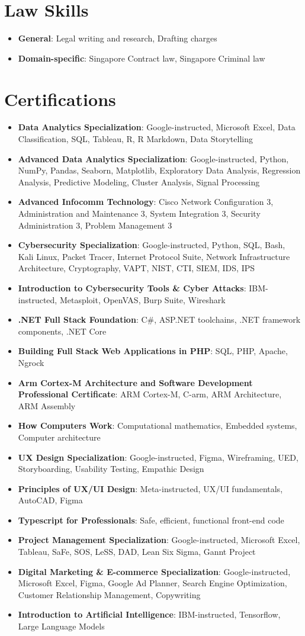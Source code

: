 \documentclass[letterpaper,11pt]{article}
\newcommand{\resumeItem}[2]{
  \item\small{
    \textbf{#1}{: #2 \vspace{-2pt}}
  }
}
\newcommand{\resumeSubItem}[2]{\resumeItem{#1}{#2}\vspace{-4pt}}
\newcommand{\resumeSubHeadingListStart}{\begin{itemize}[leftmargin=*]}
\newcommand{\resumeSubHeadingListEnd}{\end{itemize}}
\begin{document}
 \section{Law Skills}
 \resumeSubHeadingListStart
   \resumeSubItem{General}
      {Legal writing and research, Drafting charges}
   \resumeSubItem{Domain-specific}
      {Singapore Contract law, Singapore Criminal law}
 \resumeSubHeadingListEnd


\section{Certifications}
 \resumeSubHeadingListStart
    \resumeSubItem{Data Analytics Specialization}
        {Google-instructed, Microsoft Excel, Data Classification, SQL, Tableau, R, R Markdown, Data Storytelling}
    \resumeSubItem{Advanced Data Analytics Specialization}
        {Google-instructed, Python, NumPy, Pandas, Seaborn, Matplotlib, Exploratory Data Analysis, Regression Analysis, Predictive Modeling, Cluster Analysis, Signal Processing}
    \resumeSubItem{Advanced Infocomm Technology}
        {Cisco Network Configuration 3, Administration and Maintenance 3, System Integration 3, Security Administration 3, Problem Management 3}
    \resumeSubItem{Cybersecurity Specialization}
        {Google-instructed, Python, SQL, Bash, Kali Linux, Packet Tracer, Internet Protocol Suite, Network Infrastructure Architecture, Cryptography, VAPT, NIST, CTI, SIEM, IDS, IPS}
    \resumeSubItem{Introduction to Cybersecurity Tools \& Cyber Attacks}
        {IBM-instructed, Metasploit, OpenVAS, Burp Suite, Wireshark}
    \resumeSubItem{.NET Full Stack Foundation}
        {C\#, ASP.NET toolchains, .NET framework components, .NET Core}
    \resumeSubItem{Building Full Stack Web Applications in PHP}
        {SQL, PHP, Apache, Ngrock}
    \resumeSubItem{Arm Cortex-M Architecture and Software Development Professional Certificate}
        {ARM Cortex-M, C-arm, ARM Architecture, ARM Assembly}
    \resumeSubItem{How Computers Work}
        {Computational mathematics, Embedded systems, Computer architecture}
    \resumeSubItem{UX Design Specialization}
        {Google-instructed, Figma, Wireframing, UED, Storyboarding, Usability Testing, Empathic Design}
    \resumeSubItem{Principles of UX/UI Design}
        {Meta-instructed, UX/UI fundamentals, AutoCAD, Figma}
    \resumeSubItem{Typescript for Professionals}
        {Safe, efficient, functional front-end code}
    \resumeSubItem{Project Management Specialization}
        {Google-instructed, Microsoft Excel, Tableau, SaFe, SOS, LeSS, DAD, Lean Six Sigma, Gannt Project}
    \resumeSubItem{Digital Marketing \& E-commerce Specialization}
        {Google-instructed, Microsoft Excel, Figma, Google Ad Planner, Search Engine Optimization, Customer Relationship Management, Copywriting}
    \resumeSubItem{Introduction to Artificial Intelligence}
        {IBM-instructed, Tensorflow, Large Language Models}
 \resumeSubHeadingListEnd
 
\end{document}
